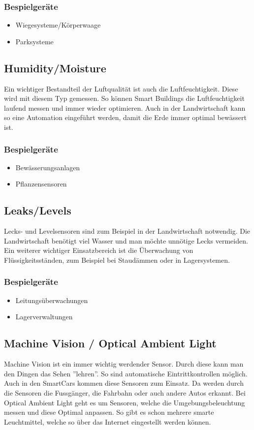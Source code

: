 \subsubsection{Bespielgeräte}
\begin{itemize}
\item	Wiegesysteme/Körperwaage
\item	Parksysteme
\end{itemize}


\subsection{Humidity/Moisture}%
Ein wichtiger Bestandteil der Luftqualität ist auch die Luftfeuchtigkeit. Diese wird mit diesem Typ gemessen. So können Smart Buildings die Luftfeuchtigkeit laufend messen und immer wieder optimieren. Auch in der Landwirtschaft kann so eine Automation eingeführt werden, damit die Erde immer optimal bewässert ist.
\subsubsection{Bespielgeräte}
\begin{itemize}
\item	Bewässerungsanlagen
\item	Pflanzensensoren
\end{itemize}


\subsection{Leaks/Levels}%
Lecks- und Levelsensoren sind zum Beispiel in der Landwirtschaft notwendig. Die Landwirtschaft benötigt  viel Wasser und man möchte unnötige Lecks vermeiden. Ein weiterer wichtiger Einsatzbereich ist die Überwachung von Flüssigkeitsständen, zum Beispiel bei Staudämmen oder in Lagersystemen.\\
\subsubsection{Bespielgeräte}
\begin{itemize}
\item	Leitungsüberwachungen
\item	Lagerverwaltungen
\end{itemize}


\subsection{Machine Vision / Optical Ambient Light}%
Machine Vision ist ein immer wichtig werdender Sensor. Durch diese kann man den Dingen das Sehen ''lehren''. So sind automatische Eintrittkontrollen möglich. Auch in den SmartCars kommen diese Sensoren zum Einsatz. Da werden durch die Sensoren die Fussgänger, die Fahrbahn oder auch andere Autos erkannt. Bei Optical Ambient Light geht es um Sensoren, welche die Umgebungsbeleuchtung messen und diese Optimal anpassen. So gibt es schon mehrere smarte Leuchtmittel, welche so über das Internet eingestellt werden können.
